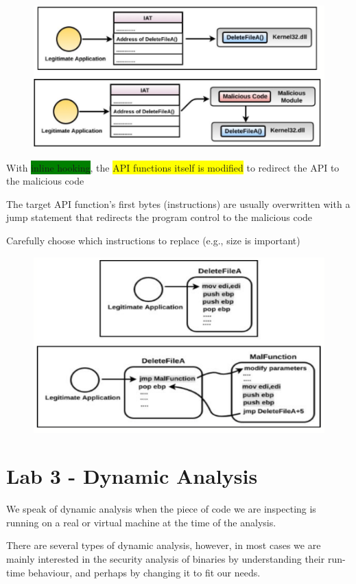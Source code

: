 \documentclass[]{project_plan}
\begin{document}
\begin{figure}[H]
  \centering
  \includegraphics[width=\linewidth]{hooking techniques.png}
\end{figure}

With \colorbox{green}{inline hooking}, the \colorbox{yellow}{API functions itself is modified} to redirect the API to the malicious code

The target API function’s first bytes (instructions) are usually overwritten with a jump statement
that redirects the program control to the malicious code

Carefully choose which instructions to replace (e.g., size is important)

\begin{figure}[H]
  \centering
  \includegraphics[width=.5\linewidth]{hooking.png}
\end{figure}

\chapter{Lab 3 - Dynamic Analysis}
We speak of dynamic analysis when the piece of code we are inspecting is
running on a real or virtual machine at the time of the analysis.

There are several
types of dynamic analysis, however, in most cases we are mainly interested in
the security analysis of binaries by understanding their run-time behaviour, and
perhaps by changing it to fit our needs.
\end{document}
